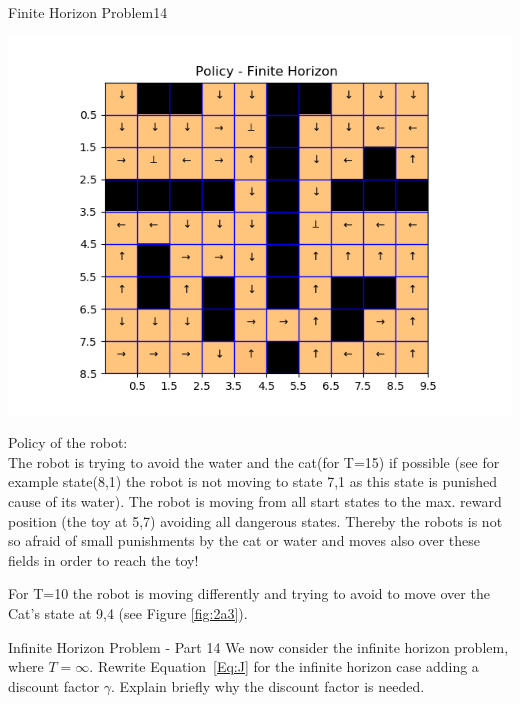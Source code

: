 \begin{questions}
\begin{question}{Finite Horizon Problem}{14}
\begin{answer}
\begin{minipage}{.5\textwidth}
	\includegraphics[width=1\textwidth]{img/2a_T10.png} 
	\label{fig:2a3}               
\end{minipage}

Policy of the robot:\\
The robot is trying to avoid the water and the cat(for T=15) if possible (see for example state(8,1) the robot is not moving to state 7,1 as this state is punished cause of its water). The robot is moving from all start states to the max. reward position (the toy at 5,7) avoiding all dangerous states. Thereby the robots is not so afraid of small punishments by the cat or water and moves also over these fields in order to reach the toy!

For T=10 the robot is moving differently and trying to avoid to move over the Cat's state at 9,4 (see Figure \ref{fig:2a3}).
	
\end{answer}

\end{question}



\begin{question}{Infinite Horizon Problem - Part 1}{4}
We now consider the infinite horizon problem, where $T=\infty$. Rewrite Equation~\eqref{Eq:J} for the infinite horizon case adding a discount factor $\gamma$. Explain briefly why the discount factor is needed.


\end{question}
\end{questions}
